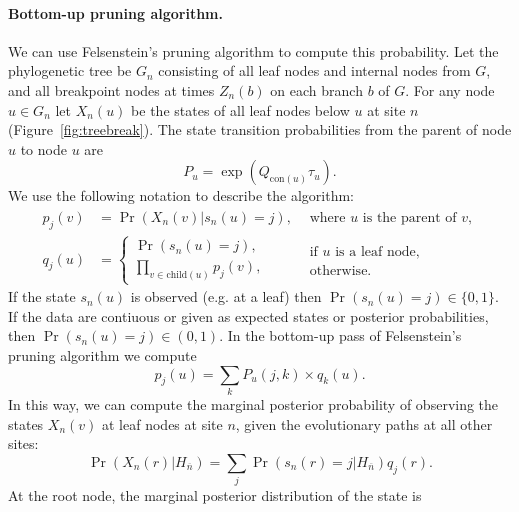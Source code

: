 \documentclass[11pt]{article}
\newcommand{\context}[1]{\ensuremath{\mathrm{con}(#1)}}
\newcommand{\child}[1]{\ensuremath{\mathrm{child}(#1)}}
\begin{document}
\paragraph{Bottom-up pruning algorithm.}
We can use Felsenstein's pruning algorithm to compute this
probability. Let the phylogenetic tree be $G_n$ consisting of all leaf
nodes and internal nodes from $G$, and all breakpoint nodes at times
$Z_n(b)$ on each branch $b$ of $G$. For any node $u\in G_n$ let
$X_n(u)$ be the states of all leaf nodes below $u$ at site $n$
(Figure~\ref{fig:treebreak}). The state transition probabilities
from the parent of node $u$ to node $u$ are
\[
P_u = \exp(Q_{\context{u}}\tau_u).
\]
We use the following notation to describe the algorithm:
\begin{equation}\label{def:pandq}
\begin{array}{lll}
p_j(v) & = \Pr(X_n(v) | s_n(u) = j), & \begin{array}{l}\mbox{where $u$ is the parent of $v$,}\end{array}\\[1em]
q_j(u) & = \left\{
\begin{array}{l}
  \Pr(s_n(u) = j),\\
  \prod_{v\in \child{u}} p_{j}(v),
\end{array}\right.&%
\begin{array}{l}
  \mbox{if $u$ is a leaf node},\\
  \mbox{otherwise}.
\end{array}
\end{array}
\end{equation}
If the state $s_n(u)$ is observed (e.g. at a leaf) then $\Pr(s_n(u) =
j) \in \{0, 1\}$. If the data are contiuous or given as expected
states or posterior probabilities, then $\Pr(s_n(u) = j) \in (0, 1)$.
In the bottom-up pass of Felsenstein's pruning algorithm we compute
\begin{equation}
  p_j(u) = {\textstyle \sum_{k}} P_u(j, k) \times q_{k}(u).
\end{equation}
In this way, we can compute the marginal posterior probability of
observing the states $X_n(v)$ at leaf nodes at site $n$, given the
evolutionary paths at all other sites:
\begin{equation}\label{eqn:leafmarginal}
  \Pr(X_n(r) | H_{\overline{n}}) = \sum_j\Pr(s_n(r) = j | H_{\overline{n}}) q_j(r).
\end{equation}
At the root node, the marginal posterior distribution of the state is
\end{document}
